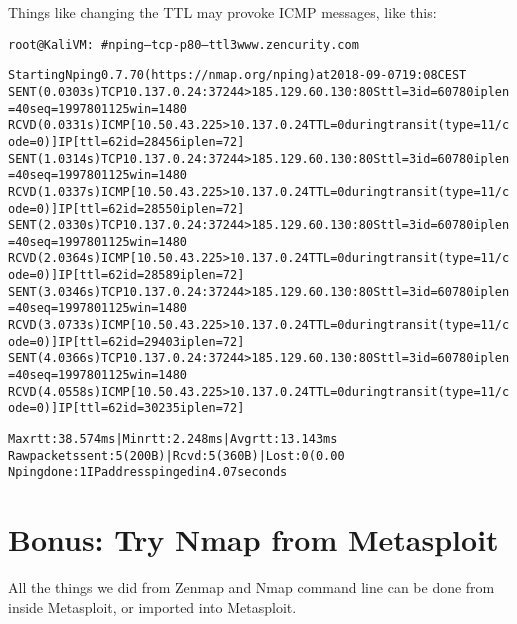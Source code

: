 \documentclass[a4paper,11pt,notitlepage]{report}
\begin{document}
Things like changing the TTL may provoke ICMP messages, like this:
\begin{alltt}\footnotesize
root@KaliVM:~# nping --tcp -p 80 --ttl 3 www.zencurity.com

Starting Nping 0.7.70 ( https://nmap.org/nping ) at 2018-09-07 19:08 CEST
SENT (0.0303s) TCP 10.137.0.24:37244 > 185.129.60.130:80 S ttl=3 id=60780 iplen=40  seq=1997801125 win=1480
RCVD (0.0331s) ICMP [10.50.43.225 > 10.137.0.24 TTL=0 during transit (type=11/code=0) ] IP [ttl=62 id=28456 iplen=72 ]
SENT (1.0314s) TCP 10.137.0.24:37244 > 185.129.60.130:80 S ttl=3 id=60780 iplen=40  seq=1997801125 win=1480
RCVD (1.0337s) ICMP [10.50.43.225 > 10.137.0.24 TTL=0 during transit (type=11/code=0) ] IP [ttl=62 id=28550 iplen=72 ]
SENT (2.0330s) TCP 10.137.0.24:37244 > 185.129.60.130:80 S ttl=3 id=60780 iplen=40  seq=1997801125 win=1480
RCVD (2.0364s) ICMP [10.50.43.225 > 10.137.0.24 TTL=0 during transit (type=11/code=0) ] IP [ttl=62 id=28589 iplen=72 ]
SENT (3.0346s) TCP 10.137.0.24:37244 > 185.129.60.130:80 S ttl=3 id=60780 iplen=40  seq=1997801125 win=1480
RCVD (3.0733s) ICMP [10.50.43.225 > 10.137.0.24 TTL=0 during transit (type=11/code=0) ] IP [ttl=62 id=29403 iplen=72 ]
SENT (4.0366s) TCP 10.137.0.24:37244 > 185.129.60.130:80 S ttl=3 id=60780 iplen=40  seq=1997801125 win=1480
RCVD (4.0558s) ICMP [10.50.43.225 > 10.137.0.24 TTL=0 during transit (type=11/code=0) ] IP [ttl=62 id=30235 iplen=72 ]

Max rtt: 38.574ms | Min rtt: 2.248ms | Avg rtt: 13.143ms
Raw packets sent: 5 (200B) | Rcvd: 5 (360B) | Lost: 0 (0.00%)
Nping done: 1 IP address pinged in 4.07 seconds
\end{alltt}


\chapter{Bonus: Try Nmap from Metasploit}
\label{ex:dbnmap}

All the things we did from Zenmap and Nmap command line can be done from inside Metasploit, or imported into Metasploit.
\end{document}
